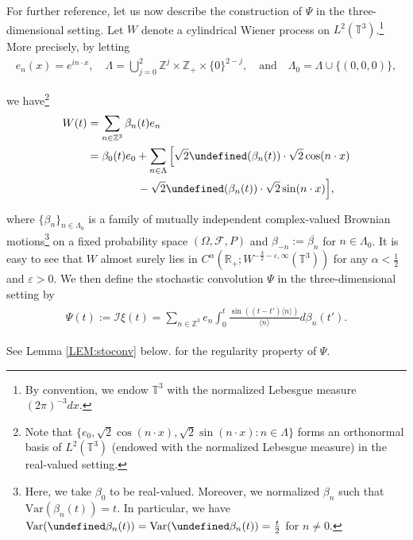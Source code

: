 \documentclass[%
11pt,  reqno]{amsart}
\newcommand{\1}{\hspace{0.2mm}\text{I}\hspace{0.2mm}}
\newcommand{\noi}{\noindent}
\newcommand{\Z}{\mathbb{Z}}
\newcommand{\R}{\mathbb{R}}
\newcommand{\T}{\mathbb{T}}
\let\Re=\undefined\DeclareMathOperator*{\Re}{Re}
\let\Im=\undefined\DeclareMathOperator*{\Im}{Im}
\newcommand{\F}{\mathcal{F}}
\newcommand{\al}{\alpha}
\newcommand{\be}{\beta}
\newcommand{\eps}{\varepsilon}
\newcommand{\Ld}{\Lambda}
\newcommand{\cj}{\overline}
\renewcommand{\O}{\Omega}
\newcommand{\jb}[1]
{\langle #1 \rangle}
\newcommand{\I}{\mathcal{I}}
\numberwithin{equation}{section}
\numberwithin{theorem}{section}
\begin{document}
For further reference,
 let us now describe  the construction of $\Psi$ in the three-dimensional setting. 
 Let  $W$ denote a cylindrical Wiener process on $L^2(\T^3)$.\footnote{By convention, 
 we endow $\T^3$ with the normalized Lebesgue measure $(2\pi)^{-3} dx$.}
More precisely, by letting %
\begin{align}
e_n(x) = e^{ i n \cdot x}, \quad 
\Ld = \bigcup_{j=0}^{2} \Z^j\times \Z_{+}\times \{0\}^{2-j}, 
\quad \text{and}\quad \Ld_0 = \Ld \cup\{(0, 0, 0)\},
\label{index}
\end{align}


\noi
we have\footnote{Note that $\{e_0, \sqrt 2\cos( n\cdot x), 
\sqrt 2 \sin ( n \cdot x):
n \in \Ld \}$ forms an orthonormal basis of $L^2(\T^3)$ 
(endowed with the normalized Lebesgue measure) in the real-valued setting.}
\begin{align}
\begin{split}
 W(t) & =  \sum_{n\in \Z^3}
\be_n (t) e_n \\
& = \be_0(t) e_0 +  \sum_{n\in \Ld}
\Big[\sqrt 2 \Re(\be_n (t)) \cdot  \sqrt 2 \cos ( n \cdot x)\\
& \hphantom{XXXXX}
- \sqrt 2\Im(\be_n (t) )\cdot \sqrt 2 \sin ( n \cdot x)\Big],
\end{split}
\label{Wiener1}
\end{align}


\noi
where $\{ \be_n\}_{n \in \Ld_0}$ is a family of  mutually independent 
 complex-valued Brownian
motions\footnote{Here, we take $\be_0$ to be real-valued.
Moreover, we normalized $\be_n$ such that 
$\text{Var}(\be_n(t)) = t$. In particular, we have 
$\text{Var}(\Re \be_n(t)) = \text{Var}(\Im \be_n(t)) = \frac{t}{2}$
for $n \ne 0$.}
on a fixed probability space $(\O, \F, P)$
and $\be_{-n} := \cj{\be_n}$ for $n \in \Ld_0$.
It is easy to see that $W$ almost surely lies in 
$C^{\al}(\R_+;W^{-\frac{3}{2}-\eps, \infty}(\T^3))$
for any $\al < \frac 12$ and $\eps > 0$.
We then define the  stochastic convolution $\Psi$  
in the three-dimensional setting by 
\begin{align}
\begin{split}
\Psi(t) := 
\I \xi (t) = \sum_{n \in \mathbb{Z}^3} e_n 
   \int_0^t \frac{\sin ((t - t') \jb{ n })}{\jb{ n }} d \beta_n (t'). 
\end{split}
\label{sconv1}
\end{align}


\noi
See Lemma \ref{LEM:stoconv} below. 
for the regularity property of $\Psi$.
\end{document}
